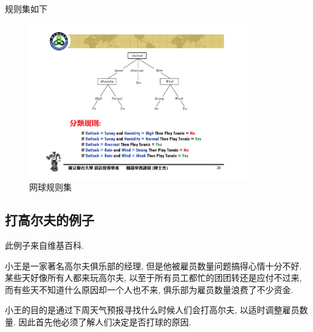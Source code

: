 \documentclass[a4paper,UTF8]{ctexart}
\theoremstyle{plain} \newtheorem{theorem}{定理}[section]
\theoremstyle{plain} \newtheorem{definition}{定义}[section]
\theoremstyle{plain} \newtheorem{lemma}{引理}[section]
\theoremstyle{plain} \newtheorem{proposition}{命题}[section]
\theoremstyle{plain} \newtheorem{example}{例}
\theoremstyle{plain} \newtheorem{remark}{注}
\theoremstyle{plain} \newtheorem{corollary}{推论}[section]
\begin{document}
规则集如下
\begin{figure}[!htb]
	\centering
	\includegraphics[width=0.85\textwidth]{table-rules}
	\caption{网球规则集}
	\label{tablerules}
\end{figure}




\subsection{打高尔夫的例子}
此例子来自维基百科.

小王是一家著名高尔夫俱乐部的经理, 但是他被雇员数量问题搞得心情十分不好. 某些天好像所有人都来玩高尔夫, 以至于所有员工都忙的团团转还是应付不过来, 而有些天不知道什么原因却一个人也不来, 俱乐部为雇员数量浪费了不少资金.

小王的目的是通过下周天气预报寻找什么时候人们会打高尔夫, 以适时调整雇员数量. 因此首先他必须了解人们决定是否打球的原因.
\end{document}

